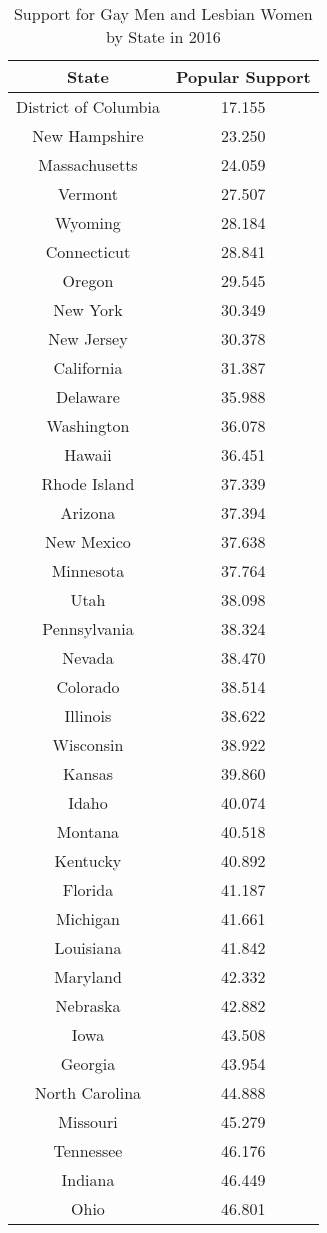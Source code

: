 
\begin{longtable}{|c|c|} %
\caption{Support for Gay Men and Lesbian Women by State in 2016}
\label{tab: pop_support} 
\hline
\textbf{State} & \textbf{Popular Support} \\
\hline
District of Columbia & 17.155\\
New Hampshire & 23.250\\
Massachusetts & 24.059\\
Vermont & 27.507\\
Wyoming & 28.184\\
Connecticut & 28.841\\
Oregon & 29.545\\
New York & 30.349\\
New Jersey & 30.378\\
California & 31.387\\
Delaware & 35.988\\
Washington & 36.078\\
Hawaii & 36.451\\
Rhode Island & 37.339\\
Arizona & 37.394\\
New Mexico & 37.638\\
Minnesota & 37.764\\
Utah & 38.098\\
Pennsylvania & 38.324\\
Nevada & 38.470\\
Colorado & 38.514\\
Illinois & 38.622\\
Wisconsin & 38.922\\
Kansas & 39.860\\
Idaho & 40.074\\
Montana & 40.518\\
Kentucky & 40.892\\
Florida & 41.187\\
Michigan & 41.661\\
Louisiana & 41.842\\
Maryland & 42.332\\
Nebraska & 42.882\\
Iowa & 43.508\\
Georgia & 43.954\\
North Carolina & 44.888\\
Missouri & 45.279\\
Tennessee & 46.176\\
Indiana & 46.449\\
Ohio & 46.801\\

\end{longtable}
